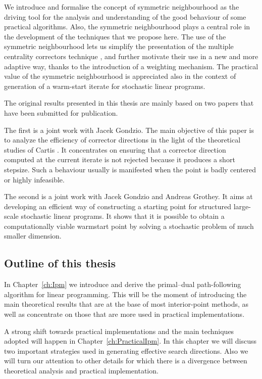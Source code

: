 We introduce and formalise the concept of symmetric neighbourhood as the
driving tool for the analysis and understanding of the good behaviour
of some practical algorithms. Also, the symmetric neighbourhood plays
a central role in the development of the techniques that we propose here.
%
The use of the symmetric neighbourhood lets us simplify the presentation
of the multiple centrality correctors technique \cite{Gondzio96}, and
further motivate their use in a new and more adaptive way, thanks to the 
introduction of a weighting mechanism.
%
The practical value of the symmetric neighbourhood is appreciated also
in the context of generation of a warm-start iterate for stochastic
linear programs.

The original results presented in this thesis are mainly based on two
papers that have been submitted for publication.

The first \cite{ColomboGondzio05} is a joint work with Jacek Gondzio.
The main objective of this paper is to analyze the efficiency of
corrector directions in the light of the theoretical studies of Cartis
\cite{Cartis04,Cartis05}. It concentrates on ensuring that a corrector
direction computed at the current iterate is not rejected because it
produces a short stepsize. Such a behaviour usually is manifested when
the point is badly centered or highly infeasible.

The second \cite{ColomboGondzioGrothey06} is a joint work with
Jacek Gondzio and Andreas Grothey. It aims at developing an
efficient way of constructing a starting point for structured 
large-scale stochastic linear programs.
It shows that it is possible to obtain a computationally viable
warmstart point by solving a stochastic problem of much smaller
dimension.


%
%
\subsection{Outline of this thesis}

In Chapter~\ref{ch:Ipm} we introduce and derive the primal--dual
path-following algorithm for linear programming. This will be
the moment of introducing the main theoretical results that are at
the base of most interior-point methods, as well as concentrate
on those that are more used in practical implementations.

A strong shift towards practical implementations and the main techniques
adopted will happen in Chapter~\ref{ch:PracticalIpm}. In this
chapter we will discuss two important strategies used in generating
effective search directions. Also we will turn our attention
to other details for which there is a divergence between theoretical
analysis and practical implementation.


